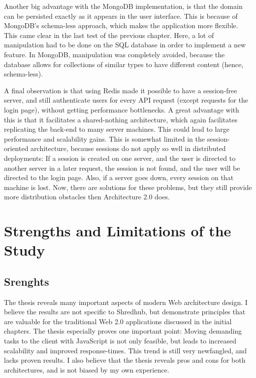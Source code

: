 Another big advantage with the MongoDB implementation, is that the domain can be persisted exactly as it appears in the user interface. This is because of MongoDB's schema-less approach, which makes the application more flexible. This came clear in the last test of the previous chapter. Here, a lot of manipulation had to be done on the SQL database in order to implement a new feature. In MongoDB, manipulation was completely avoided, because the database allows for collections of similar types to have different content (hence, schema-less).

A final observation is that using Redis made it possible to have a session-free server, and still authenticate users for every API request (except requests for the login page), without getting performance bottlenecks. A great advantage with this is that it facilitates a shared-nothing architecture, which again facilitates replicating the back-end to many server machines. This could lead to large performance and scalability gains. This is somewhat limited in the session-oriented architecture, because sessions do not apply so well in distributed deployments: If a session is created on one server, and the user is directed to another server in a later request, the session is not found, and the user will be directed to the login page. Also, if a server goes down, every session on that machine is lost. Now, there are solutions for these problems, but they still provide more distribution obstacles then Architecture 2.0 does. 

\section{Strengths and Limitations of the Study}
\subsection{Srenghts}
The thesis reveals many important aspects of modern Web architecture design. I believe the results are not specific to Shredhub, but demonstrate principles that are valuable for the traditional Web 2.0 applications discussed in the initial chapters. The thesis especially proves one important point: Moving demanding tasks to the client with JavaScript is not only feasible, but leads to increased scalability and improved response-times. This trend is still very newfangled, and lacks proven results. I also believe that the thesis reveals pros and cons for both architectures, and is not biased by my own experience. 

